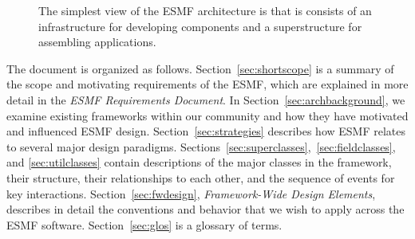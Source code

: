 \begin{figure}
\label{fig:sandwich}
\caption[{ESMF Architecture}]{The simplest view of the ESMF architecture
is that is consists of an infrastructure for developing components and 
a superstructure for assembling applications.}
\end{figure}

The document is organized as follows.  Section~\ref{sec:shortscope} is a summary of the 
scope and motivating requirements of the ESMF, which are explained in more detail in 
the {\it ESMF Requirements Document}.  In Section~\ref{sec:archbackground}, 
we examine existing frameworks within our community and how they have motivated
and influenced ESMF design.  
Section~\ref{sec:strategies} describes how ESMF relates to several
major design paradigms.
Sections~\ref{sec:superclasses},~\ref{sec:fieldclasses}, and
\ref{sec:utilclasses} contain descriptions of the 
major classes in the framework, their structure, their relationships to each other, 
and the sequence of events for key interactions.  Section~\ref{sec:fwdesign}, {\it 
Framework-Wide Design Elements}, describes in detail the conventions and behavior
that we wish to apply across the ESMF software.  Section~\ref{sec:glos} is a 
glossary of terms.








